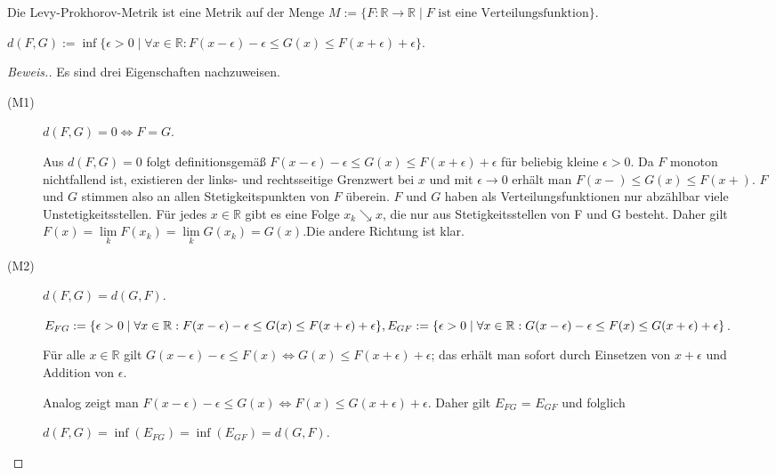 \begin{lemma}
    Die Levy-Prokhorov-Metrik ist eine Metrik auf der Menge $M:=\{F:\mathbb{R}\to\mathbb{R}\mid F \text{ ist eine Verteilungsfunktion}\}$.
    \begin{center}
        $d(F,G) := \inf\{\epsilon > 0\mid \forall x \in \mathbb{R}: F(x-\epsilon) - \epsilon \leq G(x) \leq F(x+\epsilon) + \epsilon \}.$ 
    \end{center}
\end{lemma}
\begin{proof}[Beweis.] Es sind drei Eigenschaften nachzuweisen.
    \begin{description}
    \item[(M1)] $d(F,G) = 0 \Leftrightarrow F = G$.

    Aus $d(F,G) = 0$ folgt definitionsgemäß $F(x-\epsilon) - \epsilon \leq G(x) \leq F(x+\epsilon) + \epsilon$ für beliebig kleine $\epsilon > 0$. Da $F$ monoton nichtfallend ist, existieren der links- und rechtsseitige Grenzwert bei $x$ und mit $\epsilon \rightarrow 0$ erhält man $F(x-) \leq G(x) \leq F(x+)$. $F$ und $G$ stimmen also an allen Stetigkeitspunkten von $F$ überein. $F$ und $G$ haben als Verteilungsfunktionen nur abzählbar viele Unstetigkeitsstellen. Für jedes $x \in \mathbb{R}$ gibt es eine Folge $x_{k} \searrow x$, die nur aus Stetigkeitsstellen von F und G besteht. Daher gilt $F(x) = \lim\limits_{k}{F(x_k)} = \lim\limits_{k}{G(x_k)} = G(x)$.\newline Die andere Richtung ist klar.

    \item[(M2)] $d(F,G) = d(G,F)$.

    $E_{FG} := \{\epsilon > 0\mid\forall x \in \mathbb{R}: F(x-\epsilon) - \epsilon \leq G(x) \leq F(x+\epsilon) + \epsilon\},\newline E_{GF} := \{\epsilon > 0\mid\forall x \in \mathbb{R}: G(x-\epsilon) - \epsilon \leq F(x) \leq G(x+\epsilon) + \epsilon\}$.

    Für alle $x \in \mathbb{R}$ gilt $G(x-\epsilon) - \epsilon \leq F(x) \Leftrightarrow G(x) \leq F(x+\epsilon) + \epsilon$; das erhält man sofort durch Einsetzen von $x+\epsilon$ und Addition von $\epsilon.$

    Analog zeigt man $F(x-\epsilon) - \epsilon \leq G(x) \Leftrightarrow F(x) \leq G(x+\epsilon) + \epsilon$. Daher gilt $E_{FG}$ = $E_{GF}$ und folglich 
    \begin{center}
        $d(F,G) = \inf(E_{FG}) = \inf(E_{GF}) = d(G,F).$
    \end{center}


\end{description}
\end{proof}
